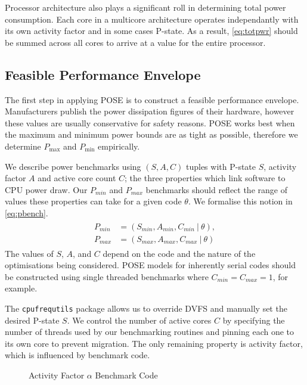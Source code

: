 Processor architecture also plays a significant roll in determining total power consumption.
Each core in a multicore architecture operates independantly with its own activity factor and in some cases P-state.
As a result, \autoref{eq:totpwr} should be summed across all cores to arrive at a value for the entire processor.

\subsection{Feasible Performance Envelope}
The first step in applying POSE is to construct a feasible performance envelope.
Manufacturers publish the power dissipation figures of their hardware, however these values are usually conservative for safety reasons.
POSE works best when the maximum and minimum power bounds are as tight as possible, therefore we determine $P_{\max}$ and $P_{\min}$ empirically.

We describe power benchmarks using $(S,A,C)$ tuples with P-state $S$, activity factor $A$ and active core count $C$; the three properties which link software to CPU power draw.
Our $P_{min}$ and $P_{max}$ benchmarks should reflect the range of values these properties can take for a given code $\theta$.
We formalise this notion in \autoref{eq:pbench}.
\begin{align}
  \label{eq:pbench}
  \begin{split}
    P_{min} &= (S_{min}, A_{min}, C_{min}~\vert~\theta), \\
    P_{max} &= (S_{max}, A_{max}, C_{max}~\vert~\theta) 
  \end{split}
\end{align}
The values of $S$, $A$, and $C$ depend on the code and the nature of the optimisations being considered.
POSE models for inherently serial codes should be constructed using single threaded benchmarks where $C_{min} = C_{max} = 1$, for example.

The \texttt{cpufrequtils} package allows us to override DVFS and manually set the desired P-state $S$.
We control the number of active cores $C$ by specifying the number of threads used by our benchmarking routines and pinning each one to its own core to prevent migration.
The only remaining property is activity factor, which is influenced by benchmark code.

\begin{figure}[ht]
\centering
\lstset{basicstyle=\ttfamily\footnotesize\bfseries, frame=tb} %

\caption{Activity Factor $\alpha$ Benchmark Code}
\label{fig:microbench}
\end{figure}

